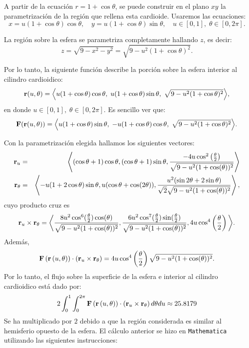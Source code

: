 \begin{parrafonumerado}
A partir de la ecuación $r = 1 + \cos \theta$, se puede construir en el plano $xy$ la parametrización de la región que rellena esta cardioide. Usaremos las ecuaciones:
\[
x = u(1 + \cos \theta) \cos \theta, \quad
y = u(1 + \cos \theta) \sin \theta, \quad
u \in [0,1],\; \theta \in [0,2\pi].
\]

La región sobre la esfera se parametriza completamente hallando $z$, es decir:
\[
z = \sqrt{9 - x^2 - y^2} = \sqrt{9 - u^2(1 + \cos \theta)^2}.
\]

Por lo tanto, la siguiente función describe la porción sobre la esfera interior al cilindro cardioidico:
\[
{\bf r}(u,\theta) =
\left\langle
u(1 + \cos \theta) \cos \theta,\;
u(1 + \cos \theta) \sin \theta,\;
\sqrt{9 - u^2(1 + \cos \theta)^2}
\right\rangle\!,
\]
en donde $u \in [0,1],\; \theta \in [0,2\pi]$. Es sencillo ver que:
{\small
\[
{\bf F}({\bf r}(u,\theta)) =
\left\langle
u(1 + \cos \theta) \sin \theta,\;
- u(1 + \cos \theta) \cos \theta,\;
\sqrt{9 - u^2(1 + \cos \theta)^2}
\right\rangle\!.
\]
}

Con la parametrización elegida hallamos los siguientes vectores:
{\footnotesize
\begin{eqnarray*}
{\bf r}_{u} &=& \left \langle (\cos \theta +1) \cos \theta ,\left(\cos \theta +1\right) \sin \theta ,\frac{-4u\cos^2\left( \frac{\theta}{2} \right)}{\sqrt{9-u^2(1+\cos(\theta))^2}}\right\rangle \\
{\bf r}_{\theta}&=&\left\langle -u( 1+2\cos \theta)\sin \theta ,u(\cos \theta +\cos (2\theta)),\frac{u^{2}(\sin 2\theta+2\sin \theta)}{\sqrt{2}\sqrt{9-u^2(1+\cos(\theta))^2}} \right\rangle ,
\end{eqnarray*}
}
cuyo producto cruz es
{\small
\begin{multline*}
{\bf r}_{u}\times {\bf r}_{\theta}= \bigg \langle \frac{8u^2\cos^6(\frac{\theta}{2})\cos(\theta)}{\sqrt{9-u^2(1+\cos(\theta))^2}}, \frac{6u^2\cos^7(\frac{\theta}{2})\sin(\frac{\theta}{2})}{\sqrt{9-u^2(1+\cos(\theta))^2}},4u\cos^4\left(\frac{\theta}{2}\right )\bigg \rangle.
\end{multline*}
}
Además,
\[{\bf F}\left({\bf r}\left( u,\theta \right) \right) \cdot \left({\bf r}_{u}\times {\bf r}_{\theta}\right) =
4u \cos^4\left(\frac{\theta}{2}\right)\sqrt{9-u^2(1+\cos(\theta))^2}.\]
Por lo tanto, el flujo sobre la superficie de la esfera e interior al cilindro cardioidico está dado por:
\begin{equation}\label{flujo7}
2\int_{0}^{1}\int_{0}^{2\pi}{\bf F}\left({\bf r}\left( u,\theta \right) \right) \cdot \left({\bf r}_{u}\times {\bf r}_{\theta}\right) d\theta du\approx 25.8179
\end{equation}
Se ha multiplicado por $2$ debido a que la región considerada es similar al hemisferio opuesto de la esfera.
El cálculo anterior se hizo en \verb"Mathematica" utilizando las siguientes instrucciones:


\end{parrafonumerado}
